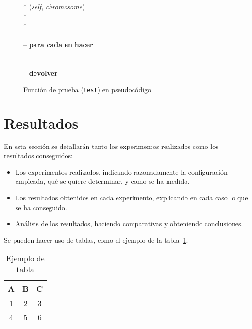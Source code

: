 \documentclass[conference,a4paper]{IEEEtran}
\begin{document}
\begin{figure}[t]
  \centering
  \begin{pseudo}*
    (\textit{self}, \textit{chromosome}) \\*
     \\*
     \\
    \textit{} \\--
    \textbf{para cada} \textit{} \textbf{en} \textit{} \textbf{hacer} \\+
        \textit{} \\
        \textit{} \\--
    \textbf{devolver} \textit{} \\
  \end{pseudo}
  \caption{Función de prueba (\texttt{test}) en pseudocódigo}
  \label{pcd:test}
\end{figure}










\section{Resultados}

En esta sección se detallarán tanto los experimentos realizados como los
resultados conseguidos:
\begin{itemize}
\item Los experimentos realizados, indicando razonadamente la configuración
  empleada, qué se quiere determinar, y como se ha medido.
\item Los resultados obtenidos en cada experimento, explicando en cada caso lo
  que se ha conseguido.
\item Análisis de los resultados, haciendo comparativas y obteniendo
  conclusiones.
\end{itemize}

Se pueden hacer uso de tablas, como el ejemplo de la tabla~\ref{tab:ejemplo}.

\begin{table}
  \caption{Ejemplo de tabla}
  \label{tab:ejemplo}
  \centering
  \begin{tabular}{ccc}
    \toprule
    A & B & C \\
    \midrule
    1 & 2 & 3 \\
    4 & 5 & 6 \\
    \bottomrule
  \end{tabular}
\end{table}
\end{document}
